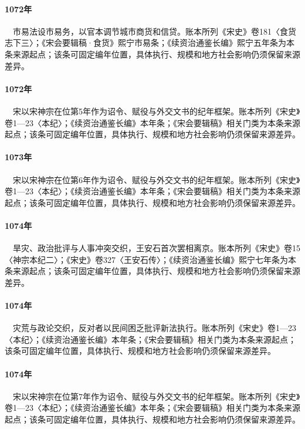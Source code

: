 \paragraph{1072年}　市易法设市易务，以官本调节城市商货和信贷。账本所列《宋史》卷181〈食货志下三〉；《宋会要辑稿·食货》熙宁市易条；《续资治通鉴长编》熙宁五年条为本条来源起点；该条可固定编年位置，具体执行、规模和地方社会影响仍须保留来源差异。

\paragraph{1072年}　宋以宋神宗在位第5年作为诏令、赋役与外交文书的纪年框架。账本所列《宋史》卷1—23〈本纪〉；《续资治通鉴长编》本年条；《宋会要辑稿》相关门类为本条来源起点；该条可固定编年位置，具体执行、规模和地方社会影响仍须保留来源差异。

\paragraph{1073年}　宋以宋神宗在位第6年作为诏令、赋役与外交文书的纪年框架。账本所列《宋史》卷1—23〈本纪〉；《续资治通鉴长编》本年条；《宋会要辑稿》相关门类为本条来源起点；该条可固定编年位置，具体执行、规模和地方社会影响仍须保留来源差异。

\paragraph{1074年}　旱灾、政治批评与人事冲突交织，王安石首次罢相离京。账本所列《宋史》卷15〈神宗本纪二〉；《宋史》卷327〈王安石传〉；《续资治通鉴长编》熙宁七年条为本条来源起点；该条可固定编年位置，具体执行、规模和地方社会影响仍须保留来源差异。

\paragraph{1074年}　灾荒与政论交织，反对者以民间困乏批评新法执行。账本所列《宋史》卷1—23〈本纪〉；《续资治通鉴长编》本年条；《宋会要辑稿》相关门类为本条来源起点；该条可固定编年位置，具体执行、规模和地方社会影响仍须保留来源差异。

\paragraph{1074年}　宋以宋神宗在位第7年作为诏令、赋役与外交文书的纪年框架。账本所列《宋史》卷1—23〈本纪〉；《续资治通鉴长编》本年条；《宋会要辑稿》相关门类为本条来源起点；该条可固定编年位置，具体执行、规模和地方社会影响仍须保留来源差异。

